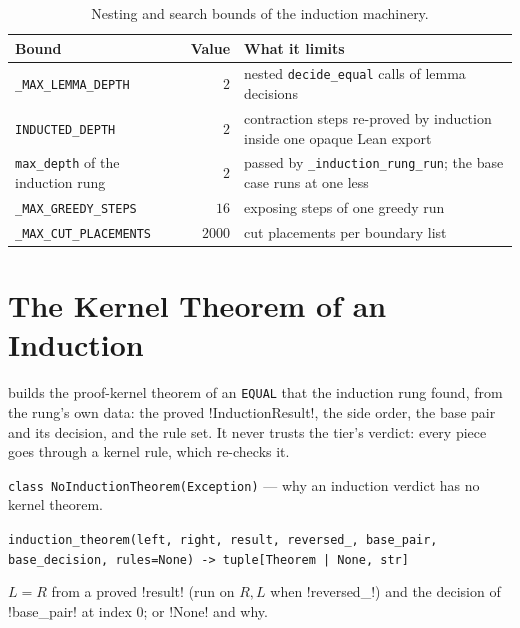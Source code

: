 \begin{table}[H]
\centering\small
\begin{tabularx}{\linewidth}{@{}lrX@{}}
\toprule
Bound & Value & What it limits \\
\midrule
\texttt{\_MAX\_LEMMA\_DEPTH} & $2$ & nested \texttt{decide\_equal} calls of lemma decisions \\
\texttt{INDUCTED\_DEPTH} & $2$ & contraction steps re-proved by induction inside one opaque Lean export \\
\texttt{max\_depth} of the induction rung & $2$ & passed by \texttt{\_induction\_rung\_run}; the base case runs at one less \\
\texttt{\_MAX\_GREEDY\_STEPS} & $16$ & exposing steps of one greedy run \\
\texttt{\_MAX\_CUT\_PLACEMENTS} & $2000$ & cut placements per boundary list \\
\bottomrule
\end{tabularx}
\caption{Nesting and search bounds of the induction machinery.}\label{tab:kernel-bounds}
\end{table}

\section{The Kernel Theorem of an Induction}\label{sec:kernel-indthm}

 builds the proof-kernel theorem of an \texttt{EQUAL} that the induction rung found, from the rung's own data: the proved \py!InductionResult!, the side order, the base pair and its decision, and the rule set. It never trusts the tier's verdict: every piece goes through a kernel rule, which re-checks it.

\begin{signature}
\texttt{class NoInductionTheorem(\allowbreak{}Exception)} --- why an induction verdict has no kernel theorem.

\texttt{induction\_\allowbreak{}theorem(\allowbreak{}left,\allowbreak{} right,\allowbreak{} result,\allowbreak{} reversed\_\allowbreak{},\allowbreak{} base\_\allowbreak{}pair,\allowbreak{} base\_\allowbreak{}decision,\allowbreak{} rules=None) -> tuple[Theorem | None,\allowbreak{} str]}

$L=R$ from a proved \code!result! (run on $R, L$ when \code!reversed_!) and the decision of \code!base_pair! at index $0$; or \py!None! and why.
\end{signature}

